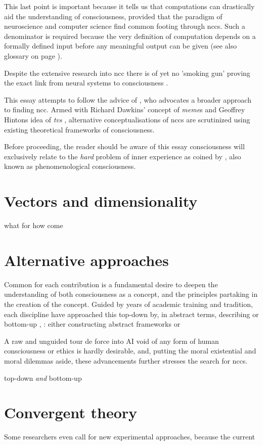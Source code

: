 \documentclass[a4paper,oneside]{memoir}
\begin{document}
This last point is important because it tells us that computations can
drastically aid the understanding of consciousness, provided that the
paradigm of neuroscience and computer science find common footing through
\gls{ncc}s. Such a denominator is required because the very definition of
computation depends on a formally defined input before any meaningful output
can be given \autocite{Nilsson2009, schmidhuber2014} (see also glossary on
page \pageref{glos}).

Despite the extensive research into \gls{ncc} there is of yet no 'smoking gun'
proving the exact link from neural systems to consciousness
\autocite{sep-consciousness, Hohwy2009, dennett2017}. 

This essay attempts to follow the advice of \textcite{Hohwy2009}, who advocates
a broader approach to finding \gls{ncc}. Armed with Richard Dawkins' concept of
\textit{\gls{meme}}s \autocite{dennett2017}
and Geoffrey Hintons idea of \textit{\gls{tv}s} \autocite{goh2017}, alternative
conceptualisations of \gls{ncc}s are scrutinized using existing theoretical
frameworks of consciousness.


Before proceeding, the reader should be aware of this essay
consciousness will exclusively relate to the \textit{hard} problem of inner experience as
coined by \cite{chalmers1995}, also known as phenomenological consciousness.
\section{Vectors and dimensionality}
what for
how come

\section{Alternative approaches}
Common for each contribution is a fundamental desire to deepen the
understanding of both consciousness as a concept, and the principles
partaking in the creation of the concept. 
Guided by years of academic training and tradition, each discipline have
approached this \gls{top-down} by, in abstract terms, describing 
or \gls{bottom-up} \autocite{sep-consciousness},
: either constructing abstract
frameworks \autocite{block2007,kouider2010} or 

A raw and unguided tour de force into AI void of any form of human consciousness or
ethics is hardly desirable, and, putting the moral existential and moral dilemmas aside,
these advancements further stresses the search for \gls{ncc}s.

\gls{top-down} \textit{and} \gls{bottom-up} \autocite{dehaene2001, baars2005}
\section{Convergent theory}

Some researchers even call for new experimental approaches, because the current 
\clearpage

\printglossary[Glossary]

\printbibliography
\end{document}
